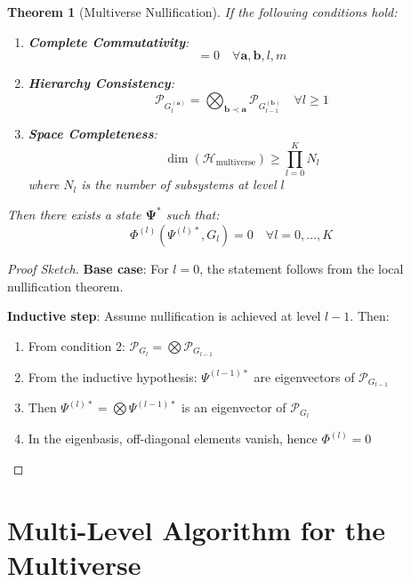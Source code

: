 \documentclass[12pt,a4paper]{article}
\newtheorem{theorem}{Theorem}[section]
\newcommand{\calH}{\mathcal{H}}
\newcommand{\calP}{\mathcal{P}}
\newcommand{\bfPsi}{\mathbf{\Psi}}
\newcommand{\bfa}{\mathbf{a}}
\newcommand{\bfb}{\mathbf{b}}
\newcommand{\PhiFunc}{\Phi}
\begin{document}
\begin{theorem}[Multiverse Nullification]
If the following conditions hold:
\begin{enumerate}
    \item \textbf{Complete Commutativity}:
    \begin{equation}
    [\calP_{G_l^{(\bfa)}}, \calP_{G_m^{(\bfb)}}] = 0 \quad \forall \bfa,\bfb, l,m
    \end{equation}
    
    \item \textbf{Hierarchy Consistency}:
    \begin{equation}
    \calP_{G_l^{(\bfa)}} = \bigotimes_{\bfb \prec \bfa} \calP_{G_{l-1}^{(\bfb)}} \quad \forall l \geq 1
    \end{equation}
    
    \item \textbf{Space Completeness}:
    \begin{equation}
    \dim(\calH_{\text{multiverse}}) \geq \prod_{l=0}^K N_l
    \end{equation}
    where $N_l$ is the number of subsystems at level $l$
\end{enumerate}

Then there exists a state $\bfPsi^*$ such that:
\begin{equation}
\PhiFunc^{(l)}(\Psi^{(l)*}, G_l) = 0 \quad \forall l = 0, \dots, K
\end{equation}
\end{theorem}

\begin{proof}[Proof Sketch]
\textbf{Base case}: For $l=0$, the statement follows from the local nullification theorem.

\textbf{Inductive step}: Assume nullification is achieved at level $l-1$. Then:
\begin{enumerate}
    \item From condition 2: $\calP_{G_l} = \bigotimes \calP_{G_{l-1}}$
    \item From the inductive hypothesis: $\Psi^{(l-1)*}$ are eigenvectors of $\calP_{G_{l-1}}$
    \item Then $\Psi^{(l)*} = \bigotimes \Psi^{(l-1)*}$ is an eigenvector of $\calP_{G_l}$
    \item In the eigenbasis, off-diagonal elements vanish, hence $\PhiFunc^{(l)} = 0$
\end{enumerate}
\end{proof}

\section{Multi-Level Algorithm for the Multiverse}
\end{document}
